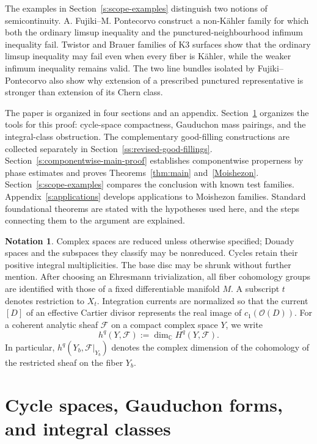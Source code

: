 \documentclass[11pt]{amsart}
\numberwithin{equation}{section}
\theoremstyle{plain}
\theoremstyle{definition}
\newtheorem{notation}[thm]{Notation}
\newcommand{\C}{\mathbb C}
\newcommand{\cF}{\mathcal F}
\newcommand{\cO}{\mathcal O}
\begin{document}
The examples in Section~\ref{s:scope-examples} distinguish two notions of
semicontinuity.  A. Fujiki--M. Pontecorvo construct a non-K\"ahler family for
which both the ordinary limsup inequality and the punctured-neighbourhood
infimum inequality fail.  Twistor and Brauer families of K3 surfaces show
that the ordinary limsup inequality may fail even when every fiber is
K\"ahler, while the weaker infimum inequality remains valid.  The two
line bundles isolated by Fujiki--Pontecorvo also show why extension of a
prescribed punctured representative is stronger than extension of its
Chern class.

The paper is organized in four sections and an appendix.
Section~\ref{s:revised-preliminaries} organizes the tools for this proof:
cycle-space compactness, Gauduchon mass pairings, and the integral-class
obstruction.  The complementary good-filling constructions are collected
separately in Section~\ref{ss:revised-good-fillings}.
Section~\ref{s:componentwise-main-proof} establishes componentwise
properness by phase estimates and proves Theorems~\ref{thm:main}
and~\ref{Moishezon}.  Section~\ref{s:scope-examples} compares the conclusion with known test
families.  Appendix~\ref{s:applications} develops applications to
Moishezon families.  Standard foundational theorems are stated with the hypotheses
used here, and the steps connecting them to the argument are explained.

\begin{notation}\label{not:conventions}
Complex spaces are reduced unless otherwise specified; Douady spaces
and the subspaces they classify may be nonreduced.  Cycles retain their
positive integral multiplicities.  The base disc may be shrunk without
further mention.
After choosing an Ehresmann trivialization, all fiber cohomology groups are
identified with those of a fixed differentiable manifold $M$.  A subscript
$t$ denotes restriction to $X_t$.  Integration currents are normalized so
that the current $[D]$ of an effective Cartier divisor represents the real
image of $c_1(\cO(D))$.
For a coherent analytic sheaf $\cF$ on a compact complex space $Y$, we write
\[
 h^q(Y,\cF):=\dim_{\C}H^q(Y,\cF).
\]
In particular, $h^q(Y_b,\cF|_{Y_b})$ denotes the complex dimension of
the cohomology of the restricted sheaf on the fiber $Y_b$.
\end{notation}


\section{Cycle spaces, Gauduchon forms, and integral classes}
\label{s:revised-preliminaries}
\end{document}
